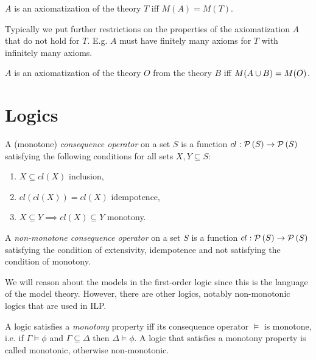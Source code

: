 \begin{defn}
$A$ is an axiomatization of the theory $T$ iff $M(A)=M(T)$.
\end{defn}

\begin{remark}
Typically we put further restrictions on the properties of the axiomatization $A$ that do not hold for $T$. E.g. $A$ must have finitely many axioms for $T$ with infinitely many axioms.
\end{remark}

\begin{defn}
$A$ is an axiomatization of the theory $O$ from the theory $B$ iff $M(A \cup B)=M(O)$.
\end{defn}

\section{Logics\cite{sep-logic-nonmonotonic}}
\begin{defn}
A (monotone) \emph{consequence operator}\cite{sergot2005knowledgeRepresentationLectureNotes} on a set $S$ is a function $cl:\mathcal{P} \left({ S }\right) \to \mathcal{P} \left({ S }\right)$ satisfying the following conditions for all sets $X, Y \subseteq S$:
\begin{enumerate}
\item $X \subseteq cl(X)$ inclusion,
\item $cl(cl(X))=cl(X)$ idempotence,
\item $X \subseteq{Y} \implies cl(X) \subseteq{Y}$ monotony.
\end{enumerate}
\end{defn}

\begin{defn}
A \emph{non-monotone consequence operator} on a set $S$ is a function
$cl:\mathcal{P} \left({ S }\right) \to \mathcal{P} \left({ S }\right)$ satisfying the condition of extensivity, idempotence and not satisfying the condition of monotony.
\end{defn}

We will reason about the models in the first-order logic since this is the language of the model theory. However, there are other logics, notably non-monotonic logics that are used in ILP.

\begin{defn}
A logic satisfies a \emph{monotony} property iff its consequence operator $\models$ is monotone, i.e.
if $\Gamma \models \phi$ and $\Gamma \subseteq \Delta$ then $\Delta \models \phi$. A logic that satisfies a monotony property is called monotonic, otherwise non-monotonic.
\end{defn}

